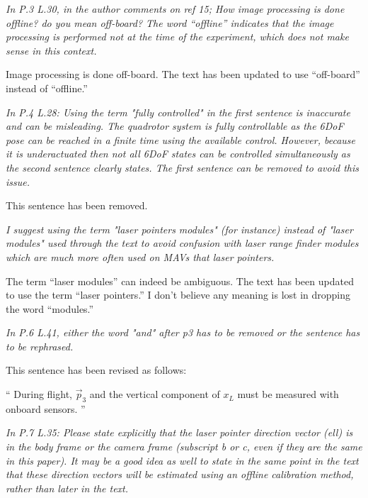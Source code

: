 \documentclass[11pt]{article}
\newenvironment{correction}{\begin{list}{}{\setlength{\leftmargin}{1cm}\setlength{\rightmargin}{1cm}}\vspace{\parsep}\item[]``}{''\end{list}}
\begin{document}
\begin{itemize}\setlength{\itemsep}{2\parsep}

\item
\textit{
In P.3 L.30, in the author comments on ref 15; How image processing is done offline? do you mean off-board? The word “offline” indicates that the image processing is performed not at the time of the experiment, which does not make sense in this context.
}

Image processing is done off-board. The text has been updated to use ``off-board'' instead of ``offline.''

\item
\textit{
In P.4 L.28: Using the term "fully controlled" in the first sentence is inaccurate and can be misleading. The quadrotor system is fully controllable as the 6DoF pose can be reached in a finite time using the available control. However, because it is underactuated then not all 6DoF states can be controlled simultaneously as the second sentence clearly states. The first sentence can be removed to avoid this issue.
}

This sentence has been removed.

\item
\textit{
I suggest using the term "laser pointers modules" (for instance) instead of "laser modules" used through the text to avoid confusion with laser range finder modules which are much more often used on MAVs that laser pointers.
}

The term ``laser modules'' can indeed be ambiguous. The text has been updated to use the term ``laser pointers.'' I don't believe any meaning is lost in dropping the word ``modules.''

\item
\textit{
In P.6 L.41, either the word "and" after p3 has to be removed or the sentence has to be rephrased.
}

This sentence has been revised as follows:

\begin{correction}
During flight, $\vec{p}_3$ and the vertical component of $x_L$ must be measured with onboard sensors. 
\end{correction}

\item
\textit{
In P.7 L.35: Please state explicitly that the laser pointer direction vector (ell) is in the body frame or the camera frame (subscript b or c, even if they are the same in this paper). 
It may be a good idea as well to state in the same point in the text that these direction vectors will be estimated using an offline calibration method, rather than later in the text. 
}


\end{itemize}
\end{document}
